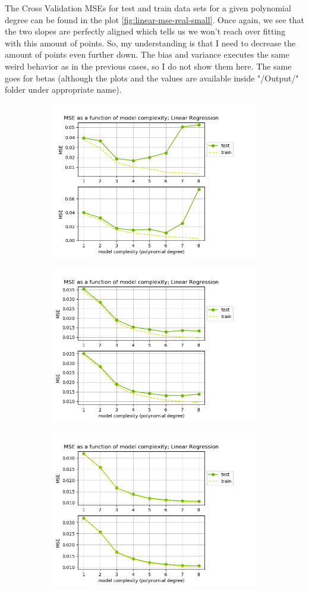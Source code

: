 The Cross Validation MSEs for test and train data sets for a given polynomial degree can be found in the plot \ref{fig:linear-mse-real-small}. Once again, we see that the two slopes are perfectly aligned which tells us we won't reach over fitting with this amount of points. So, my understanding is that I need to decrease the amount of points even further down. The bias and variance executes the same weird behavior as in the previous cases, so I do not show them here. The same goes for betas (although the plots and the values are available inside "/Output/" folder under appropriate name).


\begin{figure}[!ht]
\begin{subfigure}{\textwidth}
  \centering
  \includegraphics[width=0.55\linewidth]{images/mse/fake_linear_mse_p08_n10.png}
\end{subfigure}
\begin{subfigure}{\textwidth}
  \centering
  \includegraphics[width=0.55\linewidth]{images/mse/fake_linear_mse_p08_n21.png}
\end{subfigure}
\begin{subfigure}{\textwidth}
  \centering
  \includegraphics[width=0.55\linewidth]{images/mse/fake_linear_mse_p08_n50.png}

\end{subfigure}
\end{figure}
